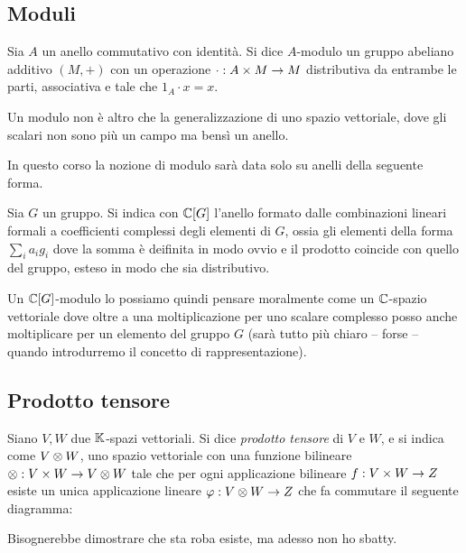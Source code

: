 \subsection{Moduli}
  \begin{mydef}
    Sia $A$ un anello commutativo con identità. Si dice $A$-modulo un gruppo abeliano additivo $(M,+)$ con un operazione $\cdot: A\times M \rightarrow M$ distributiva da entrambe le parti, associativa e tale che $1_A \cdot x = x$.
  \end{mydef}
  
  Un modulo non è altro che la generalizzazione di uno spazio vettoriale, dove gli scalari non sono più un campo ma bensì un anello.
  
  In questo corso la nozione di modulo sarà data solo su anelli della seguente forma.
  \begin{mydef}
    Sia $G$ un gruppo. Si indica con $\mathbb C[G]$ l'anello formato dalle combinazioni lineari formali a coefficienti complessi degli elementi di $G$, ossia gli elementi della forma $\sum_i a_ig_i$ dove la somma è deifinita in modo ovvio e il prodotto coincide con quello del gruppo, esteso in modo che sia distributivo. 
  \end{mydef}
  
  Un $\mathbb C[G]$-modulo lo possiamo quindi pensare moralmente come un $\mathbb C$-spazio vettoriale dove oltre a una moltiplicazione per uno scalare complesso posso anche moltiplicare per un elemento del gruppo $G$ (sarà tutto più chiaro -- forse -- quando introdurremo il concetto di rappresentazione).

\subsection{Prodotto tensore}
  \begin{mydef}
    Siano $V, W$ due $\mathbb K$-spazi vettoriali. Si dice \emph{prodotto tensore} di $V$ e $W$, e si indica come $V\otimes W$, uno spazio vettoriale con una funzione bilineare $\otimes: V \times W \rightarrow V\otimes W$ tale che per ogni applicazione bilineare $f: V\times W \rightarrow Z$ esiste un unica applicazione lineare $\varphi: V\otimes W \rightarrow Z$ che fa commutare il seguente diagramma:
    
  
  \end{mydef}
  
  Bisognerebbe dimostrare che sta roba esiste, ma adesso non ho sbatty.

